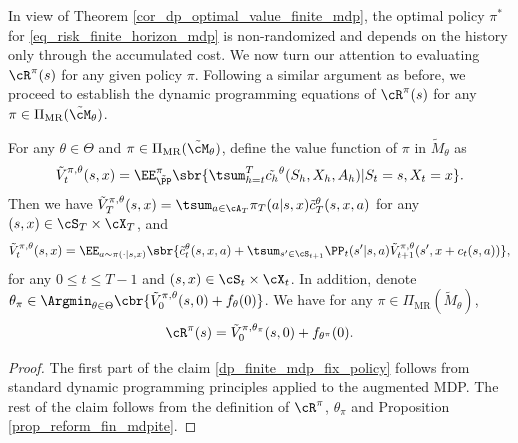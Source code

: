 \documentclass[9pt]{article}
\numberwithin{equation}{section}
\begin{document}
In view of Theorem \ref{cor_dp_optimal_value_finite_mdp}, the optimal policy $\pi^*$ for \eqref{eq_risk_finite_horizon_mdp} is non-randomized and  depends on the history only through the accumulated cost. 
We now turn our attention to evaluating $\cR^\pi(s)$ for any given policy $\pi$. Following a similar argument as before, we proceed to establish the dynamic programming equations 
of $\cR^\pi(s)$ for any $\pi \in \Pi_{\mathrm{MR}}(\tilde{\cM}_\theta)$.

\begin{theorem}\label{theorem_risk_dp_fix_policy}
    For any $\theta \in \Theta$ and $\pi \in \Pi_{\mathrm{MR}}(\tilde{\cM}_\theta)$, define the value function of $\pi$ in $\tilde{M}_\theta$ as 
    \begin{align*}
        \tilde{V}_t^{\pi , \theta} (s, x) = 
        \EE^{\pi}_{\tilde{\PP}} 
        \sbr{
        \tsum_{h=t}^T \tilde{c_h}^\theta(S_h, X_h, A_h) | S_t = s, X_t = x
        }.
    \end{align*}
    Then we have 
    $\tilde{V}^{\pi, \theta}_T(s,x) = \tsum_{a \in \cA_T} \pi_T(a|s,x) \tilde{c}_T^\theta(s,x,a)$ for any $(s, x) \in \cS_T \times \cX_T$, and 
    \begin{align}\label{dp_finite_mdp_fix_policy}
        \tilde{V}^{\pi, \theta}_t(s, x) = \EE_{a \sim \pi(\cdot|s, x)} \sbr{
        \tilde{c}_t^\theta(s, x, a) + 
        \tsum_{s' \in \cS_{t+1}} \PP_t(s'|s, a) \tilde{V}_{t+1}^{\pi, \theta}(s', x + c_t(s, a))
        }, 
    \end{align}
    for any $0 \leq t \leq T-1$ and $ (s,x) \in \cS_t \times \cX_t$.
    In addition,  
denote $\theta_\pi \in \Argmin_{\theta \in \Theta} \cbr{\tilde{V}^{\pi, \theta}_0(s, 0) + f_\theta(0)}$.
We have for any $\pi \in \Pi_{\mathrm{MR}}(\tilde{M}_\theta)$,
    \begin{align*}
        \cR^\pi(s) = \tilde{V}^{ \pi, \theta_\pi}_0(s, 0) + f_{\theta^\pi}(0).
    \end{align*}
\end{theorem}
\begin{proof}
    The first part of the claim \eqref{dp_finite_mdp_fix_policy} follows from standard dynamic programming principles applied to the augmented MDP. 
    The rest of the claim follows from the definition of $\cR^\pi$, $\theta_\pi$ and Proposition \ref{prop_reform_fin_mdpite}.
\end{proof}
\end{document}
